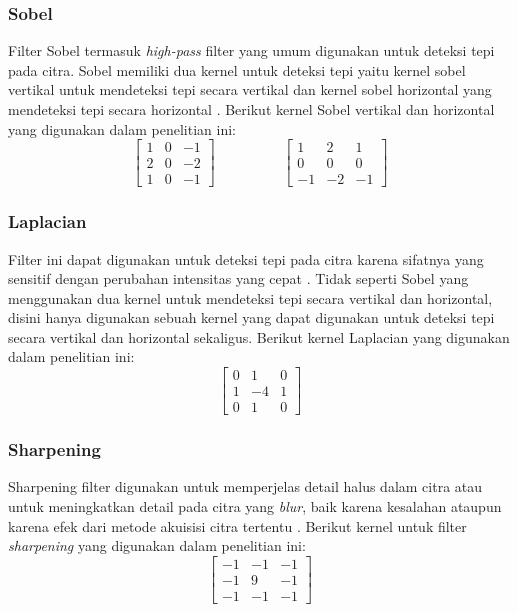 \subsubsection{Sobel}
Filter Sobel termasuk \textit{high-pass} filter yang umum digunakan untuk deteksi tepi pada citra. Sobel memiliki dua kernel untuk deteksi tepi yaitu kernel sobel vertikal untuk mendeteksi tepi secara vertikal dan kernel sobel horizontal yang mendeteksi tepi secara horizontal \cite{pdf:marcin}. Berikut kernel Sobel vertikal dan horizontal yang digunakan dalam penelitian ini:
\begin{equation}
    \label{kernel:sobel}
    \left[
    \begin{matrix}
 1 & 0 & -1 \\
 2 & 0 & -2 \\
 1 & 0 & -1
    \end{matrix}
    \right]
    \hspace{2cm}
    \left[
 \begin{matrix}
 1 & 2 & 1 \\
 0 & 0 & 0 \\
 -1 & -2 & -1
    \end{matrix}
    \right]
\end{equation}

\subsubsection{Laplacian}
Filter ini dapat digunakan untuk deteksi tepi pada citra karena sifatnya yang sensitif dengan perubahan intensitas yang cepat \cite{pdf:jingbo}. Tidak seperti Sobel yang menggunakan dua kernel untuk mendeteksi tepi secara vertikal dan horizontal, disini hanya digunakan sebuah kernel yang dapat digunakan untuk deteksi tepi secara vertikal dan horizontal sekaligus. Berikut kernel Laplacian yang digunakan dalam penelitian ini:
\begin{equation}
    \label{kernel:laplacian}
    \left[
    \begin{matrix}
 0 & 1 & 0 \\
 1 & -4 & 1 \\
 0 & 1 & 0
    \end{matrix}
    \right]
\end{equation}

\subsubsection{Sharpening}
Sharpening filter digunakan untuk memperjelas detail halus dalam citra atau untuk meningkatkan detail pada citra yang \textit{blur}, baik karena kesalahan ataupun karena efek dari metode akuisisi citra tertentu \cite{pdf:ching}. Berikut kernel untuk filter \textit{sharpening} yang digunakan dalam penelitian ini:
\begin{equation}
    \label{kernel:sharpen}
    \left[
    \begin{matrix}
 -1 & -1 & -1 \\
 -1 & 9 & -1 \\
 -1 & -1 & -1
    \end{matrix}
    \right]
\end{equation}

